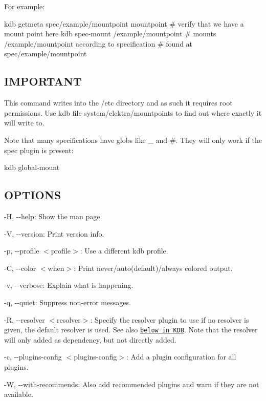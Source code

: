 For example\+: \begin{DoxyVerb}    kdb getmeta spec/example/mountpoint mountpoint  # verify that we have a mount point here
    kdb spec-mount /example/mountpoint  # mounts /example/mountpoint according to specification
            # found at spec/example/mountpoint
\end{DoxyVerb}


\subsection*{I\+M\+P\+O\+R\+T\+A\+NT}

This command writes into the {\ttfamily /etc} directory and as such it requires root permissions. Use {\ttfamily kdb file system/elektra/mountpoints} to find out where exactly it will write to.

Note that many specifications have globs like {\ttfamily \+\_\+} and {\ttfamily \#}. They will only work if the {\ttfamily spec} plugin is present\+: \begin{DoxyVerb}    kdb global-mount
\end{DoxyVerb}


\subsection*{O\+P\+T\+I\+O\+NS}


\begin{DoxyItemize}
\item {\ttfamily -\/H}, {\ttfamily -\/-\/help}\+: Show the man page.
\item {\ttfamily -\/V}, {\ttfamily -\/-\/version}\+: Print version info.
\item {\ttfamily -\/p}, {\ttfamily -\/-\/profile $<$profile$>$}\+: Use a different kdb profile.
\item {\ttfamily -\/C}, {\ttfamily -\/-\/color $<$when$>$}\+: Print never/auto(default)/always colored output.
\item {\ttfamily -\/v}, {\ttfamily -\/-\/verbose}\+: Explain what is happening.
\item {\ttfamily -\/q}, {\ttfamily -\/-\/quiet}\+: Suppress non-\/error messages.
\item {\ttfamily -\/R}, {\ttfamily -\/-\/resolver $<$resolver$>$}\+: Specify the resolver plugin to use if no resolver is given, the default resolver is used. See also \href{#KDB}{\tt below in K\+DB}. Note that the resolver will only added as dependency, but not directly added.
\item {\ttfamily -\/c}, {\ttfamily -\/-\/plugins-\/config $<$plugins-\/config$>$}\+: Add a plugin configuration for all plugins.
\item {\ttfamily -\/W}, {\ttfamily -\/-\/with-\/recommends}\+: Also add recommended plugins and warn if they are not available.
\end{DoxyItemize}

